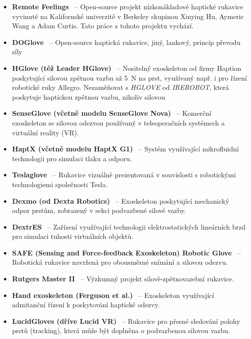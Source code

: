 \documentclass[FZS,DP]{tulthesis}
\begin{document}
\begin{itemize}
    \item \textbf{Remote Feelings}~\cite{Krycner2024} – Open-source projekt nízkonákladové haptické rukavice vyvinuté na Kalifornské univerzitě v Berkeley skupinou Xinying Hu, Aymeric Wang a Adam Curtis. Tato práce z tohoto projektu vychází.
    \item \textbf{DOGlove}~\cite{GIUDICI2025} – Open-source haptická rukavice, jiný, lankový, princip převodu síly
    \item \textbf{HGlove (též Leader HGlove)}~\cite{GIUDICI2025,Giudici2024} – Nositelný exoskeleton od firmy Haption poskytující silovou zpětnou vazbu až 5~N na prst, využívaný např. i pro řízení robotické ruky Allegro. Nezaměňovat s \textit{HGLOVE} od \textit{IREROBOT}, která poskytuje haptickou zpětnou vazbu, nikoliv silovou
    \item \textbf{SenseGlove (včetně modelu SenseGlove Nova)}~\cite{GIUDICI2025,Zhang2025,Li2025,Mizrahi2023} – Komerční exoskeleton se silovou odezvou používaný v teleoperačních systémech a virtuální reality (VR).
    \item \textbf{HaptX (včetně modelu HaptX G1)}~\cite{Mizrahi2023,GIUDICI2025,Li2025,Zhang2025} – Systém využívající mikrofluidní technologii pro simulaci tlaku a odporu.
    \item \textbf{Teslaglove}~\cite{Krycner2024,GIUDICI2025} – Rukavice vizuálně prezentovaná v souvislosti s robotickými technologiemi společnosti Tesla.
    \item \textbf{Dexmo (od Dexta Robotics)}~\cite{GIUDICI2025,Mizrahi2023,Krycner2024} – Exoskeleton poskytující mechanický odpor prstům, zobrazený v sekci podvazbené silové vazby.
    \item \textbf{DextrES}~\cite{Li2025,GIUDICI2025} – Zařízení využívající technologii elektrostatických lineárních brzd pro simulaci tuhosti virtuálních objektů.
    \item \textbf{SAFE (Sensing and Force-feedback Exoskeleton) Robotic Glove}~\cite{Belcamino2024} – Robotická rukavice navržená pro obousměrné snímání a silovou odezvu.
    \item \textbf{Rutgers Master II}~\cite{Belcamino2024,GIUDICI2025,Li2025} – Výzkumný projekt silově-zpětnovazební rukavice.
    \item \textbf{Hand exoskeleton (Ferguson et al.)}~\cite{Belcamino2024} – Exoskeleton využívající admitanční řízení k poskytování haptické odezvy.
    \item \textbf{LucidGloves (dříve Lucid VR)}~\cite{Krycner2024} – Rukavice pro přesné sledování polohy prstů (tracking), která může být doplněna o podvazbenou silovou vazbu.

\end{itemize}
\end{document}
